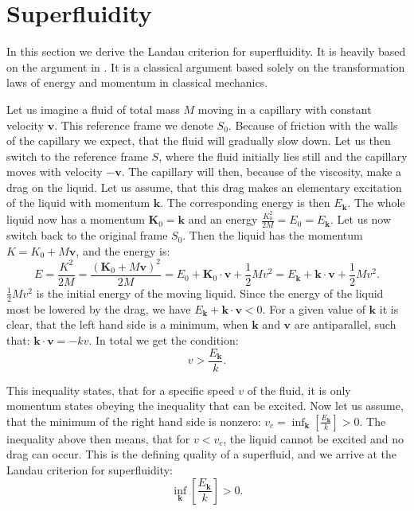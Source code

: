 \section{Superfluidity} \label{sec.Superfluidity}
In this section we derive the Landau criterion for superfluidity. It is heavily based on the argument in \cite[pp. 88-90]{LandauStatPhys2}. It is a classical argument based solely on the transformation laws of energy and momentum in classical mechanics. 

Let us imagine a fluid of total mass $M$ moving in a capillary with constant velocity $\mathbf{v}$. This reference frame we denote $S_0$. Because of friction with the walls of the capillary we expect, that the fluid will gradually slow down. Let us then switch to the reference frame $S$, where the fluid initially lies still and the capillary moves with velocity $-\mathbf{v}$. The capillary will then, because of the viscosity, make a drag on the liquid. Let us assume, that this drag makes an elementary excitation of the liquid with momentum $\mathbf{k}$. The corresponding energy is then $E_{\mathbf{k}}$. The whole liquid now has a momentum $\mathbf{K}_0 = \mathbf{k}$ and an energy $\frac{K_0^2}{2M} = E_0 = E_{\mathbf{k}}$. Let us now switch back to the original frame $S_0$. Then the liquid has the momentum $K = K_0 + M\mathbf{v}$, and the energy is:
\begin{equation}
E = \frac{K^2}{2M} = \frac{(\mathbf{K}_0 + M\mathbf{v})^2}{2M} = E_0 + \mathbf{K}_0\cdot \mathbf{v} + \frac{1}{2}Mv^2 = E_{\mathbf{k}} + \mathbf{k} \cdot \mathbf{v} + \frac{1}{2}Mv^2 . \nonumber
\end{equation}
$\frac{1}{2}Mv^2$ is the initial energy of the moving liquid. Since the energy of the liquid most be lowered by the drag, we have $E_{\mathbf{k}} + \mathbf{k} \cdot \mathbf{v} < 0 $. For a given value of $\mathbf{k}$ it is clear, that the left hand side is a minimum, when $\mathbf{k}$ and $\mathbf{v}$ are antiparallel, such that: $ \mathbf{k}\cdot \mathbf{v} = -kv$. In total we get the condition:
\begin{equation}
v > \frac{E_{\mathbf{k}}}{k}. \nonumber
\end{equation}

This inequality states, that for a specific speed $v$ of the fluid, it is only momentum states obeying the inequality that can be excited. Now let us assume, that the minimum of the right hand side is nonzero: $v_c = \inf_{\mathbf{k}}\left[\frac{E_{\mathbf{k}}}{k} \right] > 0$. The inequality above then means, that for $v < v_c$, the liquid cannot be excited and no drag can occur. This is the defining quality of a superfluid, and we arrive at the Landau criterion for superfluidity:
\begin{equation}
\inf_{\mathbf{k}}\left[\frac{E_{\mathbf{k}}}{k} \right] > 0.
\end{equation}


